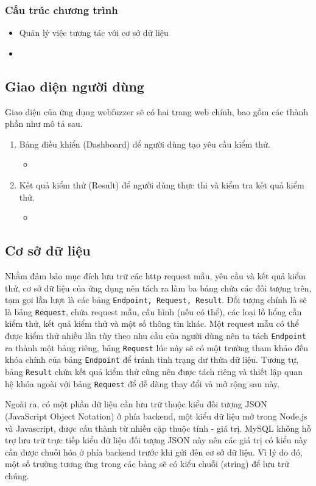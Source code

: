 \subsubsection{Cấu trúc chương trình}
\begin{itemize}
    \item Quản lý việc tương tác với cơ sở dữ liệu
    \item 
\end{itemize}
\subsection{Giao diện người dùng}
Giao diện của ứng dụng webfuzzer sẽ có hai trang web chính, bao gồm các thành phần như mô tả sau.
\begin{enumerate}
    \item Bảng điều khiển (Dashboard) để người dùng tạo yêu cầu kiểm thử.
    \begin{itemize}
        \item 
    \end{itemize}
    \item Kết quả kiểm thử (Result) để người dùng thực thi và kiểm tra kết quả kiểm thử.
    \begin{itemize}
        \item 
    \end{itemize}
\end{enumerate}
\subsection{Cơ sở dữ liệu}
Nhằm đảm bảo mục đích lưu trữ các \acrshort{http} request mẫu, yêu cầu và kết quả kiểm thử, cơ sở dữ liệu của ứng dụng nên tách ra làm ba bảng chứa các đối tượng trên, tạm gọi lần lượt là các bảng \texttt{Endpoint, Request, Result}. Đối tượng chính là sẽ là bảng \texttt{Request}, chứa request mẫu, cấu hình (nếu có thể), các loại lỗ hổng cần kiểm thử, kết quả kiểm thử và một số thông tin khác. Một request mẫu có thể được kiểm thử nhiều lần tùy theo nhu cầu của người dùng nên ta tách \texttt{Endpoint} ra thành một bảng riêng, bảng \texttt{Request} lúc này sẽ có một trường tham khảo đến khóa chính của bảng \texttt{Endpoint} để tránh tình trạng dư thừa dữ liệu. Tương tự, bảng \texttt{Result} chứa kết quả kiểm thử cũng nên được tách riêng và thiết lập quan hệ khóa ngoài với bảng \texttt{Request} để dễ dàng thay đổi và mở rộng sau này.\par
Ngoài ra, có một phần dữ liệu cần lưu trữ thuộc kiểu đối tượng JSON (JavaScript Object Notation) ở phía backend, một kiểu dữ liệu mở trong Node.js và Javascript, được cấu thành từ nhiều cặp thuộc tính - giá trị. MySQL không hỗ trợ lưu trữ trực tiếp kiểu dữ liệu đối tượng JSON này nên các giá trị có kiểu này cần được chuỗi hóa ở phía backend trước khi gửi đến cơ sở dữ liệu. Vì lý do đó, một số trường tương ứng trong các bảng sẽ có kiểu chuỗi (string) để lưu trữ chúng.